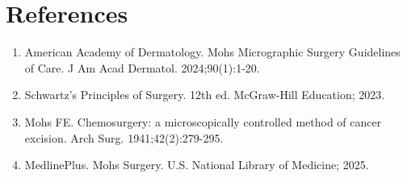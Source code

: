 \section*{References}
\begin{enumerate}
  \item American Academy of Dermatology. Mohs Micrographic Surgery Guidelines of Care. J Am Acad Dermatol. 2024;90(1):1-20.
  
  \item Schwartz's Principles of Surgery. 12th ed. McGraw-Hill Education; 2023.
  
  \item Mohs FE. Chemosurgery: a microscopically controlled method of cancer excision. Arch Surg. 1941;42(2):279-295.
  
  \item MedlinePlus. Mohs Surgery. U.S. National Library of Medicine; 2025.
\end{enumerate}

\clearpage
